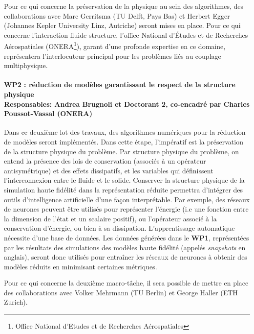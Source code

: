 \documentclass[12pt, french]{article}
\begin{document}
	Pour ce qui concerne la préservation de la physique au sein des algorithmes, des collaborations avec Marc Gerritsma (TU Delft, Pays Bas) et Herbert Egger (Johannes Kepler University Linz, Autriche) seront mises en place. Pour ce qui concerne l'interaction fluide-structure, l'office National d'Études et de Recherches Aérospatiales (ONERA\footnote{Office National d'Etudes et de Recherches Aérospatiales}), garant d'une profonde expertise en ce domaine, représentera l'interlocuteur principal pour les problèmes liés au couplage multiphysique.
	
	\paragraph[\large WP2 : réduction de modèles garantissant le respect de la structure physique\\
	Responsables: Andrea Brugnoli et Doctorant 2, co-encadré par Charles Poussot-Vassal (ONERA)]{\large WP2 : réduction de modèles garantissant le respect de la structure physique\\
		Responsables: Andrea Brugnoli et Doctorant 2, co-encadré par Charles Poussot-Vassal (ONERA)\\}
	
	Dans ce deuxième lot des travaux, des algorithmes numériques pour la réduction de modèles seront implémentés. Dans cette étape, l'impératif est la préservation de la structure physique du problème. 	Par structure physique du problème, on entend la présence des lois de conservation (associés à un opérateur antisymétrique) et des effets dissipatifs, et les variables qui définissent l'interconnexion entre le fluide et le solide. Conserver la structure physique de la simulation haute fidélité dans la représentation réduite permettra d'intégrer des outils d'intelligence artificielle d'une façon interprétable. Par exemple, des réseaux de neurones peuvent être utilisés pour représenter l'énergie (i.e une fonction entre la dimension de l'état et un scalaire positif), ou l'opérateur associé à la conservation d'énergie, ou bien à sa dissipation. L'apprentissage automatique nécessite d'une base de données. Les données générées dans le \textbf{WP1}, représentées par les résultats des simulations des modèles haute fidélité (appelés \textit{snapshots} en anglais), seront donc utilisés pour entraîner les réseaux de neurones à obtenir des modèles réduits en minimisant certaines métriques.
	
	Pour ce qui concerne la deuxième macro-tâche, il sera possible de mettre en place des collaborations avec Volker Mehrmann (TU Berlin) et George Haller (ETH Zurich).
	
\end{document}
